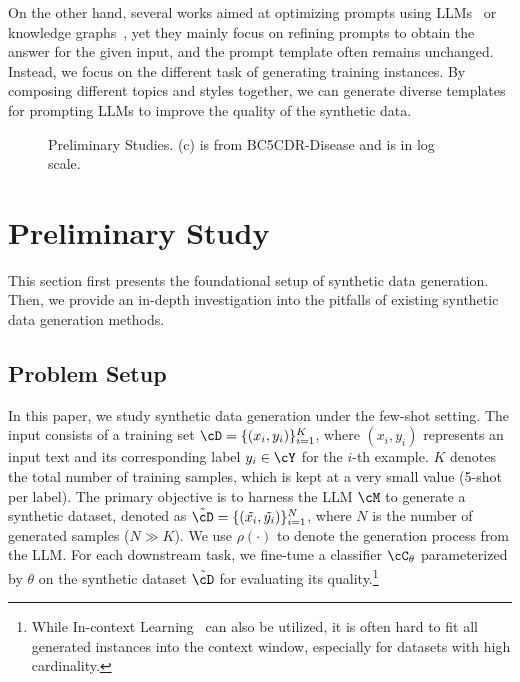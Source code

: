 On the other hand, several works aimed at optimizing prompts using LLMs~\citep{zhou2023large,wang2023promptagent} or knowledge graphs~\citep{cui2023a,liu-etal-2022-generated,chen2022knowprompt}, yet they mainly focus on refining prompts to obtain the answer for the given input, and the prompt template often remains unchanged. 
Instead, we focus on the different task of generating training instances. By composing different topics and styles together, we can generate diverse templates for prompting LLMs to improve the quality of the synthetic data.
 \begin{figure*}[!t]
	\centering
	\vspace{-2.5ex}
         \hspace{-1.5ex}
 \hspace{-1.5ex}
	\caption{Preliminary Studies. (c) is from BC5CDR-Disease and is in log scale. \vspace{-1ex}}

\label{fig:prelim2}
\end{figure*}

\section{Preliminary Study}
\vspace{-0.5ex}

\label{sec:preliminary}
This section first presents the foundational setup of synthetic data generation. 
Then, we provide an in-depth investigation into the pitfalls of existing synthetic data generation methods. 

\vspace{-1ex}
\subsection{Problem Setup}
In this paper, we study synthetic data generation under the few-shot setting.
The input consists of a training set $\cD=\{(x_i,y_i)\}_{i=1}^K$, where $(x_i, y_i)$ represents an input text and its corresponding label $y_i \in \cY$ for the $i$-th example. $K$ denotes the total number of training samples, which is  kept at a very small value (5-shot per label). The primary objective is to harness the LLM $\cM$ to generate a synthetic dataset, denoted as $\tilde{\cD}=\{(\tilde{x_i},\tilde{y_i})\}_{i=1}^N$, where $N$ is the number of generated samples ($N \gg K$). 
We use $\rho(\cdot)$ to denote the generation process from the LLM.
For each downstream task, we fine-tune a classifier $\cC_{\theta}$  parameterized by $\theta$ on the synthetic dataset $\tilde{\cD}$ for evaluating its quality.\footnote{While In-context Learning~\citep{brown2020language} can also be utilized, it is often hard to fit all generated instances into the context window, especially for datasets with high cardinality.}

